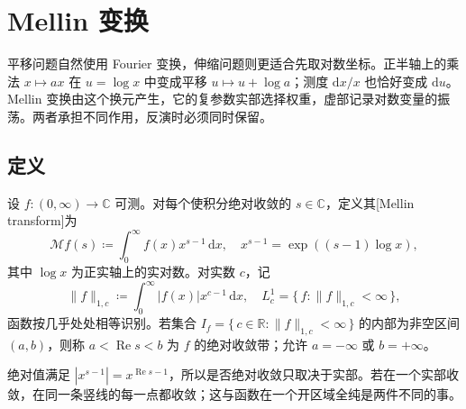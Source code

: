 \section{Mellin 变换}
\label{b3:sec:2105}

平移问题自然使用 Fourier 变换，伸缩问题则更适合先取对数坐标。正半轴上的乘法 \(x\mapsto ax\) 在 \(u=\log x\) 中变成平移 \(u\mapsto u+\log a\)；测度 \(\mathrm dx/x\) 也恰好变成 \(\mathrm du\)。Mellin 变换由这个换元产生，它的复参数实部选择权重，虚部记录对数变量的振荡。两者承担不同作用，反演时必须同时保留。

\subsection{定义}
\label{b3:subsec:210501}

\begin{definition}\label{b3:def:21-mellin}
设 \(f:(0,\infty)\to\mathbb C\) 可测。对每个使积分绝对收敛的 \(s\in\mathbb C\)，定义其[Mellin transform]为
\[
 \mathcal Mf(s)\coloneqq\int_0^\infty f(x)x^{s-1}\,\mathrm dx,
 \quad x^{s-1}=\exp((s-1)\log x),
\]
其中 \(\log x\) 为正实轴上的实对数。对实数 \(c\)，记
\[
 \|f\|_{1,c}\coloneqq\int_0^\infty|f(x)|x^{c-1}\,\mathrm dx,
 \quad L^1_c=\{\,f:\|f\|_{1,c}<\infty\,\},
\]
函数按几乎处处相等识别。若集合 \(I_f=\{\,c\in\mathbb R:\|f\|_{1,c}<\infty\,\}\) 的内部为非空区间 \((a,b)\)，则称 \(a<\operatorname{Re}s<b\) 为 \(f\) 的绝对收敛带；允许 \(a=-\infty\) 或 \(b=+\infty\)。
\end{definition}
绝对值满足 \(|x^{s-1}|=x^{\operatorname{Re}s-1}\)，所以是否绝对收敛只取决于实部。若在一个实部收敛，在同一条竖线的每一点都收敛；这与函数在一个开区域全纯是两件不同的事。

